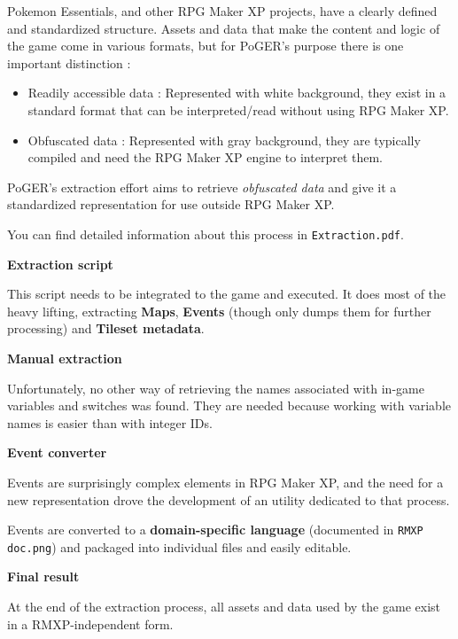 \documentclass[11pt]{article}
\begin{document}
Pokemon Essentials, and other RPG Maker XP projects, have a clearly defined and standardized structure. Assets and data that make the content and logic of the game come in various formats, but for PoGER's purpose there is one important distinction :

\begin{itemize}
	\item Readily accessible data : Represented with white background, they exist in a standard format that can be interpreted/read without using RPG Maker XP.
	
	\item Obfuscated data : Represented with gray background, they are typically compiled and need the RPG Maker XP engine to interpret them.
\end{itemize}

PoGER's extraction effort aims to retrieve \textit{obfuscated data} and give it a standardized representation for use outside RPG Maker XP.

You can find detailed information about this process in \verb|Extraction.pdf|.

\vspace{2mm}
\textbf{Extraction script}

This script needs to be integrated to the game and executed. It does most of the heavy lifting, extracting \textbf{Maps}, \textbf{Events} (though only dumps them for further processing) and \textbf{Tileset metadata}.

\vspace{2mm}
\textbf{Manual extraction}

Unfortunately, no other way of retrieving the names associated with in-game variables and switches was found. They are needed because working with variable names is easier than with integer IDs.

\vspace{2mm}
\textbf{Event converter}

Events are surprisingly complex elements in RPG Maker XP, and the need for a new representation drove the development of an utility dedicated to that process.

Events are converted to a \textbf{domain-specific language} (documented in \verb|RMXP doc.png|) and packaged into individual files and easily editable.

\vspace{2mm}
\textbf{Final result}

At the end of the extraction process, all assets and data used by the game exist in a RMXP-independent form.
\end{document}
